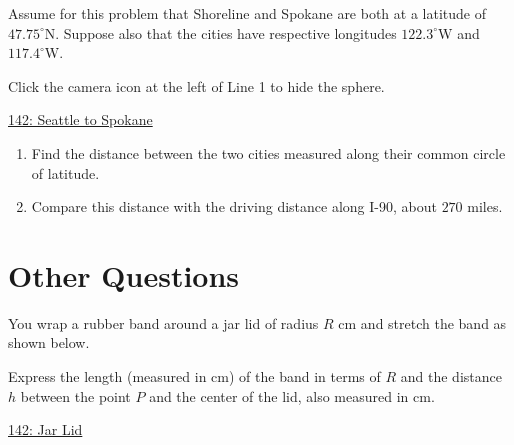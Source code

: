 \documentclass{ximera}
\begin{document}
\begin{question}  \label{QODfefEREr}
Assume for this problem that Shoreline and Spokane are both at a latitude of $47.75^\circ$N. Suppose also that the cities have respective longitudes $122.3^\circ$W and $117.4^\circ$W. 

Click the camera icon at the left of Line 1 to hide the sphere.

\begin{onlineOnly}
    \begin{center}
\end{center}
\end{onlineOnly}

\href{https://www.desmos.com/3d/rjb4gcf8lo}{142: Seattle to Spokane}


\begin{enumerate}
\item Find the distance between the two cities measured along their common circle of latitude.

\item Compare this distance with the driving distance along I-90, about $270$ miles.

\end{enumerate}

\end{question}


\section{Other Questions}

\begin{question} \label{QdfRERER}
You wrap a rubber band around a jar lid of radius $R$ cm and stretch the band as shown below.

Express the length (measured in cm) of the band in terms of $R$ and the distance $h$ between the point $P$ and the center of the lid, also measured in cm.


\begin{onlineOnly}
    \begin{center}
\end{center}
\end{onlineOnly}

\href{https://www.desmos.com/calculator/wz5qiyj4od}{142: Jar Lid}

\end{question}
\end{document}
